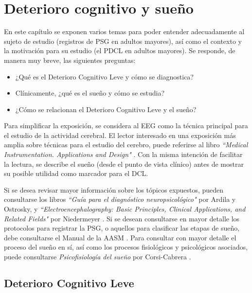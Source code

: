 \documentclass[12pt,letterpaper,draft]{book}
\begin{document}
\chapter{Deterioro cognitivo y sueño}

En este capítulo se exponen varios temas para poder entender adecuadamente al sujeto de estudio (registros de PSG en adultos mayores), así como el contexto y la motivación para su estudio (el PDCL en adultos mayores).
%
Se responde, de manera muy breve, las siguientes preguntas:
\begin{itemize}
\item ¿Qué es el Deterioro Cognitivo Leve y cómo se diagnostica?
\item Clínicamente, ¿qué es el sueño y cómo se estudia?
\item ¿Cómo se relacionan el Deterioro Cognitivo Leve y el sueño?
\end{itemize}

Para simplificar la exposición, se considera al EEG como la técnica principal para el estudio de la actividad cerebral.
%
El lector interesado en una exposición más amplia sobre técnicas para el estudio del cerebro, puede referirse al libro \textit{``Medical Instrumentation. Applications and Design"} \cite{Webster}.
%
Con la misma intención de facilitar la lectura, se describe el sueño (desde el punto de vista clínico) antes de mostrar su posible utilidad como marcador para el DCL.

Si se desea revisar mayor información sobre los tópicos expuestos, pueden consultarse los libros \textit{``Guía para el diagnóstico neuropsicológico"} \cite{Ardila12} por Ardila y Ostrosky, y \textit{``Electroencephalography: Basic Principles, Clinical Applications, and Related Fields"} por Niedermeyer \cite{niedermeyer}.
%
Si se desean consultarse en mayor detalle los protocolos para registrar la PSG, o aquellos para clasificar las etapas de sueño, debe consultarse el Manual de la AASM \cite{AASM07}.
%
Para consultar con mayor detalle el proceso del sueño en sí, así como los procesos fisiológicos y psicológicos asociados, puede consultarse \textit{Psicofisiología del sueño} por Corsi-Cabrera \cite{Corsi1983}.


\section{Deterioro Cognitivo Leve}
\label{seccion:dcl}
\end{document}
